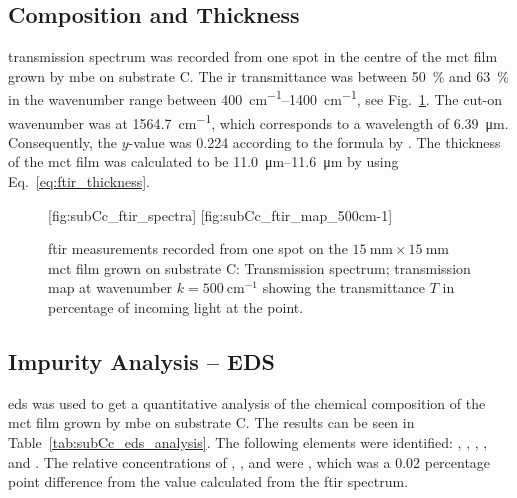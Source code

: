 \subsection{Composition and Thickness}

 transmission spectrum was recorded from one spot in the centre of the \ac{mct} film grown by \ac{mbe} on substrate C. The \ac{ir} transmittance was between \SI{50}{\percent} and \SI{63}{\percent} in the wavenumber range between \SIrange{400}{1400}{\centi\metre^{-1}}, see Fig.~\ref{fig:subCc_ftir}. The cut-on wavenumber was at \SI{1564.7}{\centi\metre^{-1}}, which corresponds to a wavelength of \SI{6.39}{\micro\metre}. Consequently, the $y$-value was \SI{0.224}{} according to the formula by \citet{bricexxxxtttt}. The thickness of the \ac{mct} film was calculated to be \SIrange{11.0}{11.6}{\micro\metre} by using Eq.~\ref{eq:ftir_thickness}.


\begin{figure}[htbp]
    \centering
    [fig:subCc_ftir_spectra]
    \hfill
    [fig:subCc_ftir_map_500cm-1]
    \caption[\Ac{ftir} measurement from one spot on the \ac{mct} film grown on substrate C.]{\Ac{ftir} measurements recorded from one spot on the $\SI{15}{\milli\metre}\times\SI{15}{\milli\metre}$ \ac{mct} film grown on substrate C:  Transmission spectrum;  transmission map at wavenumber $k=\SI{500}{\centi\metre^{-1}}$ showing the transmittance $T$ in percentage of incoming light at the point.}\label{fig:subCc_ftir}
\end{figure}

\subsection{Impurity Analysis -- EDS}

\Ac{eds} was used to get a quantitative analysis of the chemical composition of the \ac{mct} film grown by \ac{mbe} on substrate C. The results can be seen in Table~\ref{tab:subCc_eds_analysis}. The following elements were identified: , , , , and . The relative concentrations of , , and  were , which was a \SI{0.02}{} percentage point difference from the value calculated from the \ac{ftir} spectrum. 

